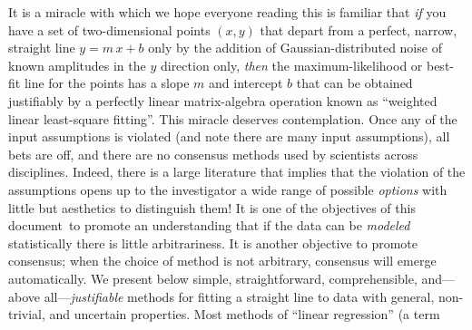 \documentclass[12pt,twoside]{article}
\newcommand{\documentname}{document}
\begin{document}
It is a miracle with which we hope everyone reading this is familiar
that \emph{if} you have a set of two-dimensional points $(x,y)$ that
depart from a perfect, narrow, straight line $y=m\,x+b$ only by the
addition of Gaussian-distributed noise of known amplitudes in the $y$
direction only, \emph{then} the maximum-likelihood or best-fit line
for the points has a slope $m$ and intercept $b$ that can be obtained
justifiably by a perfectly linear matrix-algebra operation known as
``weighted linear least-square fitting''.  This miracle deserves
contemplation.  Once any of the input assumptions is violated (and
note there are many input assumptions), all bets are off, and there
are no consensus methods used by scientists across disciplines.
Indeed, there is a large literature that implies that the violation of
the assumptions opens up to the investigator a wide range of possible
\emph{options} with little but aesthetics to distinguish them!  It is
one of the objectives of this \documentname\ to promote an
understanding that if the data can be \emph{modeled} statistically
there is little arbitrariness.  It is another objective to promote
consensus; when the choice of method is not arbitrary, consensus will
emerge automatically.  We present below simple, straightforward,
comprehensible, and---above all---\emph{justifiable} methods for
fitting a straight line to data with general, non-trivial, and
uncertain properties.  Most methods of ``linear regression'' (a term
\end{document}
